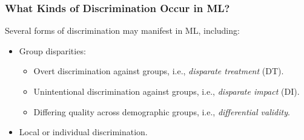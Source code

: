 \documentclass[11pt,aspectratio=169,hyperref={colorlinks}]{beamer}
\begin{document}
		\begin{frame}
		
			\frametitle{What Kinds of Discrimination Occur in ML?}	
			
			\noindent \Large Several forms of discrimination may manifest in ML, including:
			\begin{itemize}
				
				\item Group disparities: 
				
				\begin{itemize}
				
					\item Overt discrimination against groups, i.e., \textit{disparate treatment} (DT).
					
					
					\item Unintentional discrimination against groups, i.e., \textit{disparate impact} (DI).
					
					
					
					\item Differing quality across demographic groups, i.e., \textit{differential validity}.
				
				\end{itemize}
				
				\item Local or individual discrimination.
				
			\end{itemize}
		
		\end{frame}			
		
\end{document}
